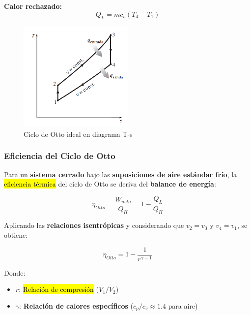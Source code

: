 \documentclass{article}
\begin{document}
    \textbf{Calor rechazado:}
    \begin{equation}
    Q_L = m c_v (T_4 - T_1)
    \end{equation}

    \begin{figure}[H]
        \centering
        \includegraphics[width=0.5\textwidth]{Pasted_image_20250803093844.png}
        \caption{Ciclo de Otto ideal en diagrama T-s}
        \label{fig:otto_ts}
    \end{figure}

    \subsubsection{Eficiencia del Ciclo de Otto}

    Para un \textbf{sistema cerrado} bajo las \textbf{suposiciones de aire estándar frío}, la \hl{eficiencia térmica} del ciclo de Otto se deriva del \textbf{balance de energía}:

    \begin{equation}
    \eta_{Otto} = \frac{W_{neto}}{Q_H} = 1 - \frac{Q_L}{Q_H}
    \end{equation}

    Aplicando las \textbf{relaciones isentrópicas} y considerando que $v_2 = v_3$ y $v_4 = v_1$, se obtiene:

    \begin{equation}
    \eta_{Otto} = 1 - \frac{1}{r^{\gamma-1}}
    \end{equation}

    Donde:
    \begin{itemize}
        \item $r$: \hl{Relación de compresión} ($V_1/V_2$)
        \item $\gamma$: \textbf{Relación de calores específicos} ($c_p/c_v \approx 1.4$ para aire)
    \end{itemize}
\end{document}
